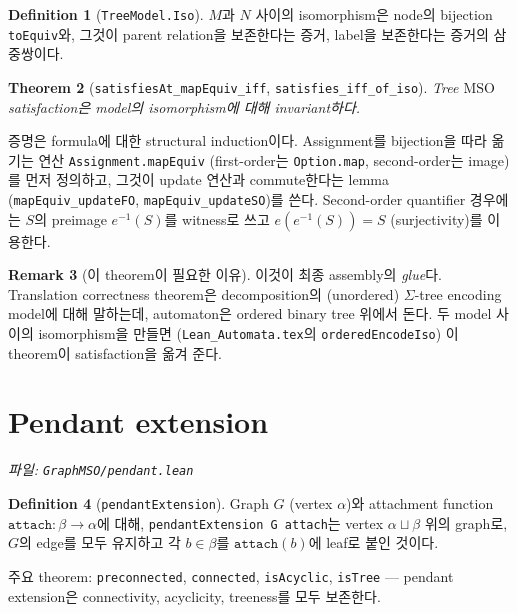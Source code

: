 \documentclass[11pt]{article}
\theoremstyle{definition}
\newtheorem{definition}{Definition}[section]
\newtheorem{remark}[definition]{Remark}
\theoremstyle{plain}
\newtheorem{theorem}[definition]{Theorem}
\newcommand{\MSO}{\mathrm{MSO}}
\newcommand{\lean}[1]{\texttt{#1}}
\newcommand{\leanfile}[1]{\texttt{#1}}
\begin{document}
\begin{definition}[\lean{TreeModel.Iso}]
\label{basics:def:treeiso}
$M$과 $N$ 사이의 isomorphism은 node의 bijection \lean{toEquiv}와,
그것이 parent relation을 보존한다는 증거, label을 보존한다는 증거의 삼중쌍이다.
\end{definition}

\begin{theorem}[\lean{satisfiesAt\_mapEquiv\_iff}, \lean{satisfies\_iff\_of\_iso}]
\label{basics:thm:isoinvariance}
Tree $\MSO$ satisfaction은 model의 isomorphism에 대해 invariant하다.
\end{theorem}

증명은 formula에 대한 structural induction이다. Assignment를 bijection을 따라
옮기는 연산 \lean{Assignment.mapEquiv} (first-order는 \lean{Option.map},
second-order는 image)를 먼저 정의하고, 그것이 update 연산과 commute한다는
lemma (\lean{mapEquiv\_updateFO}, \lean{mapEquiv\_updateSO})를 쓴다.
Second-order quantifier 경우에는 $S$의 preimage $e^{-1}(S)$를 witness로 쓰고
$e(e^{-1}(S)) = S$ (surjectivity)를 이용한다.

\begin{remark}[이 theorem이 필요한 이유]
이것이 최종 assembly의 \emph{glue}다. Translation correctness theorem은
decomposition의 (unordered) $\Sigma$-tree encoding model에 대해 말하는데,
automaton은 ordered binary tree 위에서 돈다. 두 model 사이의 isomorphism을
만들면 (\leanfile{Lean\_Automata.tex}의 \lean{orderedEncodeIso}) 이 theorem이
satisfaction을 옮겨 준다.
\end{remark}

\section{Pendant extension}
\label{basics:sec:pendant}

\emph{파일: \leanfile{GraphMSO/pendant.lean}}

\begin{definition}[\lean{pendantExtension}]
\label{basics:def:pendant}
Graph $G$ (vertex $\alpha$)와 attachment function
$\lean{attach} : \beta \to \alpha$에 대해,
\lean{pendantExtension G attach}는 vertex $\alpha \sqcup \beta$ 위의 graph로,
$G$의 edge를 모두 유지하고 각 $b \in \beta$를 $\lean{attach}(b)$에 leaf로
붙인 것이다.
\end{definition}

주요 theorem: \lean{preconnected}, \lean{connected}, \lean{isAcyclic},
\lean{isTree} --- pendant extension은 connectivity, acyclicity, treeness를 모두
보존한다.
\end{document}
